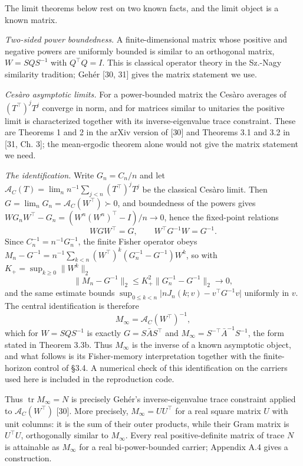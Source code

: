 \documentclass[
  10pt,
]{article}
\begin{document}
The limit theorems below rest on two known facts, and the limit object
is a known matrix.

\emph{Two-sided power boundedness.} A finite-dimensional matrix whose
positive and negative powers are uniformly bounded is similar to an
orthogonal matrix, \(W=SQS^{-1}\) with \(Q^\top Q=I\). This is classical
operator theory in the Sz.-Nagy similarity tradition; Gehér {[}30, 31{]}
gives the matrix statement we use.

\emph{Cesàro asymptotic limits.} For a power-bounded matrix the Cesàro
averages of \((T^\top)^jT^j\) converge in norm, and for matrices similar
to unitaries the positive limit is characterized together with its
inverse-eigenvalue trace constraint. These are Theorems 1 and 2 in the
arXiv version of {[}30{]} and Theorems 3.1 and 3.2 in {[}31, Ch. 3{]};
the mean-ergodic theorem alone would not give the matrix statement we
need.

\emph{The identification.} Write \(G_n=C_n/n\) and let
\(\mathcal A_C(T)=\lim_n n^{-1}\sum_{j<n}(T^\top)^jT^j\) be the
classical Cesàro limit. Then \(G=\lim_nG_n=\mathcal A_C(W^\top)\succ0\),
and boundedness of the powers gives
\(WG_nW^\top-G_n=(W^n(W^n)^\top-I)/n\to0\), hence the fixed-point
relations \[
WGW^\top=G,\qquad W^\top G^{-1}W=G^{-1}.
\] Since \(C_n^{-1}=n^{-1}G_n^{-1}\), the finite Fisher operator obeys
\(M_n-G^{-1}=n^{-1}\sum_{k<n}(W^\top)^k(G_n^{-1}-G^{-1})W^k\), so with
\(K_+=\sup_{k\ge0}\|W^k\|_2\) \[
\boxed{\bigl\lVert M_n-G^{-1}\bigr\rVert_2\le K_+^2\bigl\lVert G_n^{-1}-G^{-1}\bigr\rVert_2\longrightarrow0,}
\] and the same estimate bounds
\(\sup_{0\le k<n}\lvert nJ_n(k;v)-v^\top G^{-1}v\rvert\) uniformly in
\(v\). The central identification is therefore \[
\boxed{M_\infty=\mathcal A_C(W^\top)^{-1},}
\] which for \(W=SQS^{-1}\) is exactly \(G=S\bar AS^\top\) and
\(M_\infty=S^{-\top}\bar A^{-1}S^{-1}\), the form stated in Theorem
3.3b. Thus \(M_\infty\) is the inverse of a known asymptotic object, and
what follows is its Fisher-memory interpretation together with the
finite-horizon control of §3.4. A numerical check of this identification
on the carriers used here is included in the reproduction code.

Thus \(\operatorname{tr}M_\infty=N\) is precisely Gehér's
inverse-eigenvalue trace constraint applied to \(\mathcal A_C(W^\top)\)
{[}30{]}. More precisely, \(M_\infty=UU^\top\) for a real square matrix
\(U\) with unit columns: it is the sum of their outer products, while
their Gram matrix is \(U^\top U\), orthogonally similar to \(M_\infty\).
Every real positive-definite matrix of trace \(N\) is attainable as
\(M_\infty\) for a real bi-power-bounded carrier; Appendix A.4 gives a
construction.
\end{document}
